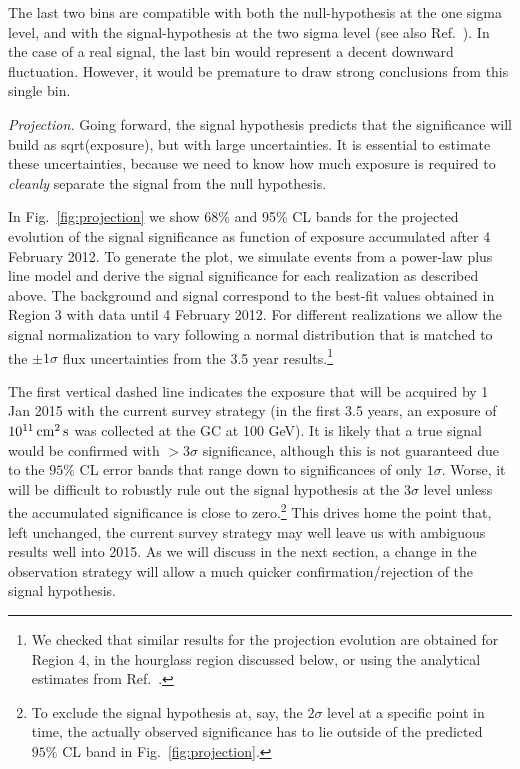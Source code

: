 \documentclass[aps,prd,superscriptaddress,nofootinbib,fixlfloat, 12pt]{revtex4-1}
\begin{document}
The last two bins are compatible with both the null-hypothesis at the one
sigma level, and with the signal-hypothesis at the two sigma level (see also
Ref.~\cite{Weniger:2013dya}). In the case of a real signal, the last bin would
represent a decent downward fluctuation. However, it would be premature to
draw strong conclusions from this single bin.

\emph{Projection.} 
Going forward, the signal hypothesis predicts that the significance will build
as sqrt(exposure), but with large uncertainties.  It is essential to estimate
these uncertainties, because we need to know how much exposure is required to
\emph{cleanly} separate the signal from the null hypothesis. 

In Fig.~\ref{fig:projection} we show 68\% and 95\% CL bands for the projected evolution of the
signal significance as function of exposure accumulated after 4 February 2012.
To generate the plot, we simulate events from a power-law plus line model and
derive the signal significance for each realization as described above. The
background and signal correspond to the best-fit values obtained in Region 3
with data until 4 February 2012.  For different realizations we allow the
signal normalization to vary following a normal distribution that is matched
to the $\pm1\sigma$ flux uncertainties from the 3.5 year results.\footnote{We
checked that similar results for the projection evolution are obtained for
Region 4, in the hourglass region discussed below, or using the analytical
estimates from Ref.~\cite{Weniger:2013dya}.}

The first vertical dashed line indicates the exposure that will be acquired by
1 Jan 2015 with the current survey strategy (in the first 3.5 years, an
exposure of $10^{11}\rm\,cm^2\,s$ was collected at the GC at 100 GeV). It is likely that a true signal
would be confirmed with $>3\sigma$ significance, although this is not
guaranteed due to the $95\%$ CL error bands that range down to significances
of only $1\sigma$. Worse, it will be difficult to robustly rule out the signal
hypothesis at the $3\sigma$ level unless the accumulated significance is close
to zero.\footnote{To exclude the signal hypothesis at, say, the $2\sigma$ level at a
specific point in time, the actually observed significance has to lie outside
of the predicted
$95\%$ CL band in Fig.~\ref{fig:projection}.} This drives home the point
that, left unchanged, the current survey
strategy may well leave us with ambiguous results well into 2015.  As we will
discuss in the next section, a change in the observation strategy will allow a
much quicker confirmation/rejection of the signal hypothesis.
\medskip
\end{document}
